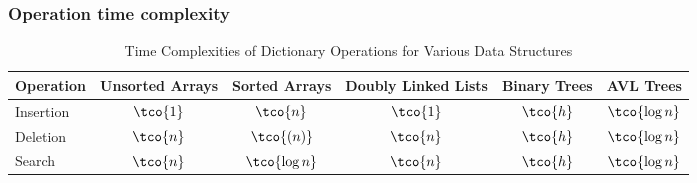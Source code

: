 \newpage
\subsubsection{Operation time complexity}
\begin{table}[h!]
    \centering
    \begin{tabular}{l c c c c c}
        \toprule
        \textbf{Operation} & \textbf{Unsorted Arrays} & \textbf{Sorted Arrays} & \textbf{Doubly Linked Lists} & \textbf{Binary Trees} & \textbf{AVL Trees} \\
        \midrule
        Insertion          & $\tco{1}$                & $\tco{n}$              & $\tco{1}$                    & $\tco{h}$             & $\tco{\log n}$     \\
        Deletion           & $\tco{n}$                & $\tco{(n)}$            & $\tco{n}$                    & $\tco{h}$             & $\tco{\log n}$     \\
        Search             & $\tco{n}$                & $\tco{\log n}$         & $\tco{n}$                    & $\tco{h}$             & $\tco{\log n}$     \\
        \bottomrule
    \end{tabular}
    \caption{Time Complexities of Dictionary Operations for Various Data Structures}
\end{table}
